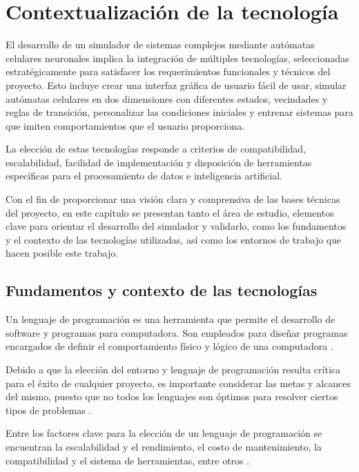 \section{Contextualización de la tecnología}

El desarrollo de un simulador de sistemas complejos mediante autómatas celulares neuronales implica la integración de múltiples tecnologías, seleccionadas estratégicamente para satisfacer los requerimientos funcionales y técnicos del proyecto. Esto incluye crear una interfaz gráfica de usuario fácil de usar, simular autómatas celulares en dos dimensiones con diferentes estados, vecindades y reglas de transición, personalizar las condiciones iniciales y entrenar sistemas para que imiten comportamientos que el usuario proporciona.

La elección de estas tecnologías responde a criterios de compatibilidad, escalabilidad, facilidad de implementación y disposición de herramientas específicas para el procesamiento de datos e inteligencia artificial. 

Con el fin de proporcionar una visión clara y comprensiva de las bases técnicas del proyecto, en este capítulo se presentan tanto el área de estudio, elementos clave para orientar el desarrollo del simulador y validarlo, como los fundamentos y el contexto de las tecnologías utilizadas, así como los entornos de trabajo que hacen posible este trabajo. 

\subsection{Fundamentos y contexto de las tecnologías}

Un lenguaje de programación es una herramienta que permite el desarrollo de software y programas para computadora. Son empleados para diseñar programas encargados de definir el comportamiento físico y lógico de una computadora \cite{uapaLenguajes}.

Debido a que la elección del entorno y lenguaje de programación resulta crítica para el éxito de cualquier proyecto, es importante considerar las metas y alcances del mismo, puesto que no todos los lenguajes son óptimos para resolver ciertos tipos de problemas \cite{clickpandaEntorno}.

Entre los factores clave para la elección de un lenguaje de programación se encuentran la escalabilidad y el rendimiento, el costo de mantenimiento, la compatibilidad y el sistema de herramientas, entre otros \cite{clickpandaEntorno}.

